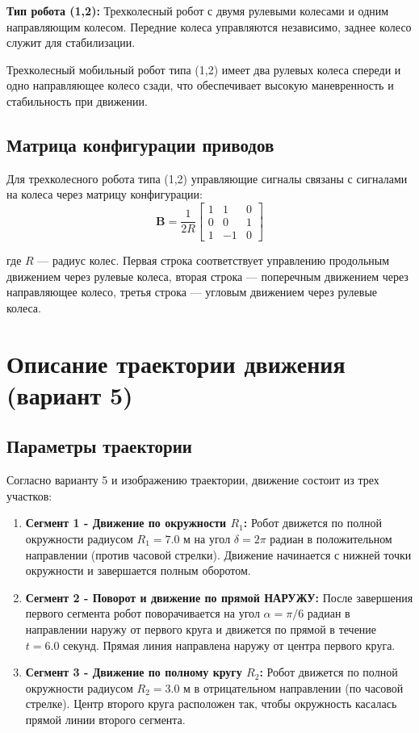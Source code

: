 \textbf{Тип робота (1,2):} Трехколесный робот с двумя рулевыми колесами и одним направляющим колесом. Передние колеса управляются независимо, заднее колесо служит для стабилизации.

Трехколесный мобильный робот типа (1,2) имеет два рулевых колеса спереди и одно направляющее колесо сзади, что обеспечивает высокую маневренность и стабильность при движении.

\subsection{Матрица конфигурации приводов}

Для трехколесного робота типа (1,2) управляющие сигналы связаны с сигналами на колеса через матрицу конфигурации:
$$\mathbf{B} = \frac{1}{2R}\begin{bmatrix}
1 & 1 & 0 \\
0 & 0 & 1 \\
1 & -1 & 0
\end{bmatrix}$$

где $R$ --- радиус колес. Первая строка соответствует управлению продольным движением через рулевые колеса, вторая строка --- поперечным движением через направляющее колесо, третья строка --- угловым движением через рулевые колеса.

\section{Описание траектории движения (вариант 5)}

\subsection{Параметры траектории}

Согласно варианту 5 и изображению траектории, движение состоит из трех участков:

\begin{enumerate}
\item \textbf{Сегмент 1 - Движение по окружности $R_1$:} 
   Робот движется по полной окружности радиусом $R_1 = 7.0$ м на угол $\delta = 2\pi$ радиан в положительном направлении (против часовой стрелки). Движение начинается с нижней точки окружности и завершается полным оборотом.
   
\item \textbf{Сегмент 2 - Поворот и движение по прямой НАРУЖУ:} 
   После завершения первого сегмента робот поворачивается на угол $\alpha = \pi/6$ радиан в направлении наружу от первого круга и движется по прямой в течение $t = 6.0$ секунд. Прямая линия направлена наружу от центра первого круга.
   
\item \textbf{Сегмент 3 - Движение по полному кругу $R_2$:} 
   Робот движется по полной окружности радиусом $R_2 = 3.0$ м в отрицательном направлении (по часовой стрелке). Центр второго круга расположен так, чтобы окружность касалась прямой линии второго сегмента.
\end{enumerate}

